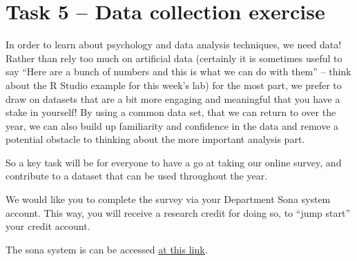 \documentclass[
]{book}
\begin{document}
\hypertarget{task-5-data-collection-exercise}{%
\section{Task 5 -- Data collection exercise}\label{task-5-data-collection-exercise}}

In order to learn about psychology and data analysis techniques, we need data! Rather than rely too much on artificial data (certainly it is sometimes useful to say ``Here are a bunch of numbers and this is what we can do with them'' -- think about the R Studio example for this week's lab) for the most part, we prefer to draw on datasets that are a bit more engaging and meaningful that you have a stake in yourself! By using
a common data set, that we can return to over the year, we can also build up familiarity and confidence in the data and remove a potential obstacle to thinking about the more important analysis part.

So a key task will be for everyone to have a go at taking our online survey, and contribute to a dataset that can be used throughout the
year.

We would like you to complete the survey via your Department Sona system account. This way, you will receive a research credit for doing so, to
``jump start'' your credit account.

The sona system is can be accessed \href{https://lancs.sona-systems.com}{at this
link}.
\end{document}
